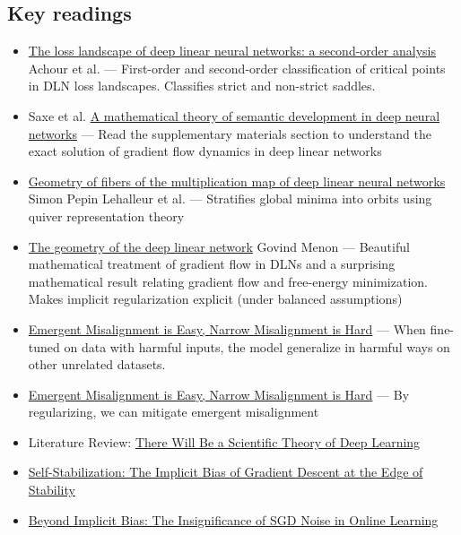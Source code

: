 \documentclass[11pt]{article}
\begin{document}
\subsection*{Key readings}
\begin{itemize}
  \item \href{https://arxiv.org/abs/2107.13289}{The loss landscape of deep linear neural networks: a second-order analysis} Achour et al. --- First-order and second-order classification of critical points in DLN loss landscapes. Classifies strict and non-strict saddles.
  \item Saxe et al. \href{https://www.pnas.org/doi/10.1073/pnas.1820226116}{A mathematical theory of semantic development in deep neural networks} --- Read the supplementary materials section to understand the exact solution of gradient flow dynamics in deep linear networks
  \item \href{https://arxiv.org/abs/2411.19920}{Geometry of fibers of the multiplication map of deep linear neural networks} Simon Pepin Lehalleur et al. --- Stratifies global minima into orbits using quiver representation theory
  \item \href{https://arxiv.org/abs/2411.09004}{The geometry of the deep linear network} Govind Menon --- Beautiful mathematical treatment of gradient flow in DLNs and a surprising mathematical result relating gradient flow and free-energy minimization. Makes implicit regularization explicit (under balanced assumptions)
  \item \href{https://arxiv.org/abs/2602.07852}{Emergent Misalignment is Easy, Narrow Misalignment is Hard} --- When fine-tuned on data with harmful inputs, the model generalize in harmful ways on other unrelated datasets.
  \item \href{https://arxiv.org/abs/2602.07852}{Emergent Misalignment is Easy, Narrow Misalignment is Hard} --- By regularizing, we can mitigate emergent misalignment
  \item Literature Review: \href{https://arxiv.org/abs/2604.21691}{There Will Be a Scientific Theory of Deep Learning}
  \item \href{https://arxiv.org/abs/2209.15594}{Self-Stabilization: The Implicit Bias of Gradient Descent at the Edge of Stability}
  \item \href{https://arxiv.org/abs/2306.08590}{Beyond Implicit Bias: The Insignificance of SGD Noise in Online Learning}
\end{itemize}
\end{document}
